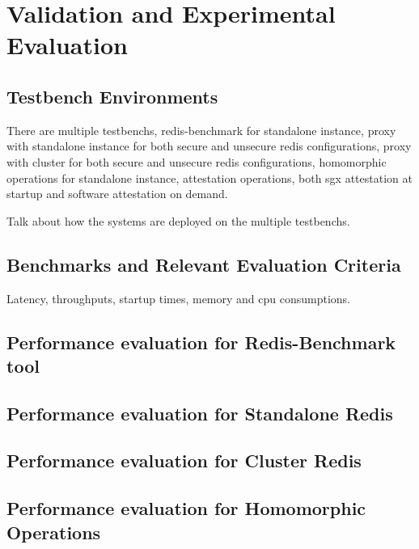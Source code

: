 
\chapter{Validation and Experimental Evaluation}
\label{cha:validation_experimental_Evaluation}

\section{Testbench Environments}
\label{sec:testbench_environment}

There are multiple testbenchs, redis-benchmark for standalone instance, proxy with standalone instance for both secure and unsecure redis configurations, proxy with cluster for both secure and unsecure redis configurations, homomorphic operations for standalone instance, attestation operations, both sgx attestation at startup and software attestation on demand.

Talk about how the systems are deployed on the multiple testbenchs.

\section{Benchmarks and Relevant Evaluation Criteria}
\label{sec:benchmarks}

Latency, throughputs, startup times, memory and cpu consumptions.

\section{Performance evaluation for Redis-Benchmark tool}
\label{sec:performance_evaluation_redisbenchmark_tool}

\section{Performance evaluation for Standalone Redis}
\label{sec:performance_evaluation_standalone_redis}

\section{Performance evaluation for Cluster Redis}
\label{sec:performance_evaluation_cluster_redis}

\section{Performance evaluation for Homomorphic Operations}
\label{sec:performance_evaluation_homomorphic_operations}

